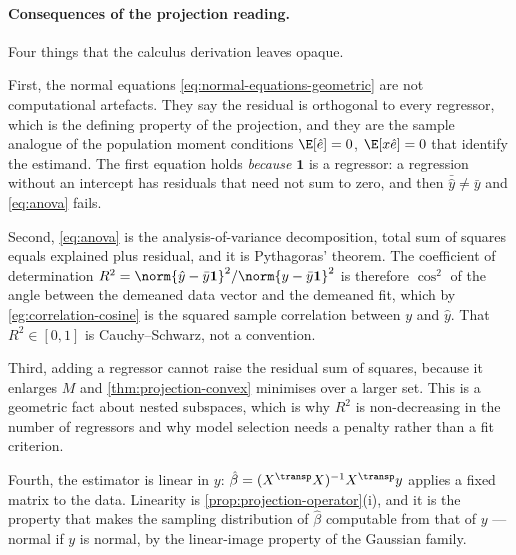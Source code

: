 \paragraph{Consequences of the projection reading.} Four things that the calculus derivation
leaves opaque.

First, the normal equations \eqref{eq:normal-equations-geometric} are not
computational artefacts. They say the residual is orthogonal to every regressor,
which is the defining property of the projection, and they are the sample analogue
of the population moment conditions $\E[\hat e]=0$, $\E[x\hat e]=0$ that identify
the estimand. The first equation holds \emph{because} $\mathbf1$ is a regressor:
a regression without an intercept has residuals that need not sum to zero, and
then $\bar{\hat y}\neq\bar y$ and \eqref{eq:anova} fails.

Second, \eqref{eq:anova} is the analysis-of-variance decomposition, total sum of
squares equals explained plus residual, and it is Pythagoras' theorem. The
coefficient of determination $R^2=\norm{\hat y-\bar y\mathbf1}^2/
	\norm{y-\bar y\mathbf1}^2$ is therefore $\cos^2$ of the angle between the
demeaned data vector and the demeaned fit, which by
\autoref{eg:correlation-cosine} is the squared sample correlation between $y$ and
$\hat y$. That $R^2\in[0,1]$ is Cauchy--Schwarz, not a convention.

Third, adding a regressor cannot raise the residual sum of squares, because it
enlarges $M$ and \autoref{thm:projection-convex} minimises over a larger set. This
is a geometric fact about nested subspaces, which is why $R^2$ is
non-decreasing in the number of regressors and why model selection needs a
penalty rather than a fit criterion.

Fourth, the estimator is linear in $y$: $\hat\beta=(X^{\transp}X)^{-1}X^{\transp}y$
applies a fixed matrix to the data. Linearity is
\autoref{prop:projection-operator}(i), and it is the property that makes the
sampling distribution of $\hat\beta$ computable from that of $y$ --- normal if
$y$ is normal, by the linear-image property of the Gaussian family.

